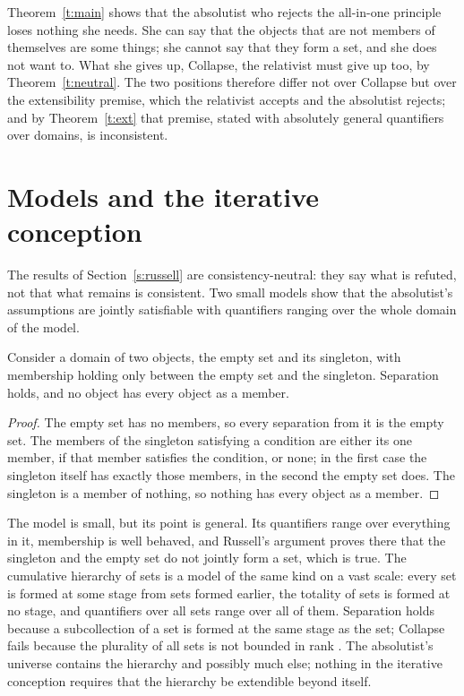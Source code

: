 \documentclass{situationist-preprint}
\begin{document}
Theorem~\ref{t:main} shows that the absolutist who rejects the all-in-one principle loses nothing she needs. She can say that the objects that are not members of themselves are some things; she cannot say that they form a set, and she does not want to. What she gives up, Collapse, the relativist must give up too, by Theorem~\ref{t:neutral}. The two positions therefore differ not over Collapse but over the extensibility premise, which the relativist accepts and the absolutist rejects; and by Theorem~\ref{t:ext} that premise, stated with absolutely general quantifiers over domains, is inconsistent.

\section{Models and the iterative conception}\label{s:models}

The results of Section~\ref{s:russell} are consistency-neutral: they say what is refuted, not that what remains is consistent. Two small models show that the absolutist's assumptions are jointly satisfiable with quantifiers ranging over the whole domain of the model.

\begin{proposition}\label{p:twomodel}
Consider a domain of two objects, the empty set and its singleton, with membership holding only between the empty set and the singleton. Separation holds, and no object has every object as a member.
\end{proposition}

\begin{proof}
The empty set has no members, so every separation from it is the empty set. The members of the singleton satisfying a condition are either its one member, if that member satisfies the condition, or none; in the first case the singleton itself has exactly those members, in the second the empty set does. The singleton is a member of nothing, so nothing has every object as a member.
\end{proof}

The model is small, but its point is general. Its quantifiers range over everything in it, membership is well behaved, and Russell's argument proves there that the singleton and the empty set do not jointly form a set, which is true. The cumulative hierarchy of sets is a model of the same kind on a vast scale: every set is formed at some stage from sets formed earlier, the totality of sets is formed at no stage, and quantifiers over all sets range over all of them. Separation holds because a subcollection of a set is formed at the same stage as the set; Collapse fails because the plurality of all sets is not bounded in rank \citep{Boolos1971}. The absolutist's universe contains the hierarchy and possibly much else; nothing in the iterative conception requires that the hierarchy be extendible beyond itself.
\end{document}
